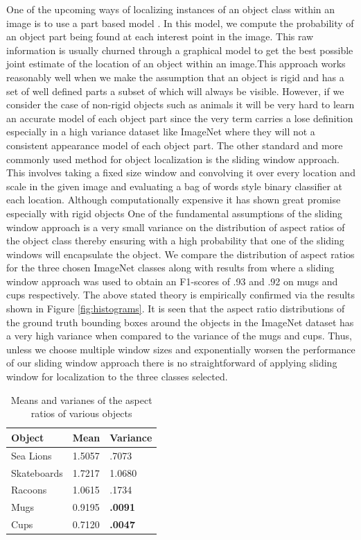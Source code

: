 \documentclass[10pt,twocolumn,letterpaper]{article}
\begin{document}
One of the upcoming ways of localizing instances of an object class within an image
is to use a part based model \cite{multiview1}. In this model, we compute the probability of an
object part being found at each interest point in the image. This raw information
is usually churned through a graphical model to get the best possible joint estimate
of the location of an object within an image.This approach works reasonably well
when we make the assumption that an object is rigid and has a set of well defined
parts a subset of which will always be visible. However, if we consider the case of 
non-rigid objects such as animals it will be very hard to learn an accurate model
of each object part since the very term carries a lose definition especially in a
high variance dataset like ImageNet where they will not a consistent appearance 
model of each object part.
The other standard and more commonly used method for object localization is the 
sliding window approach. This involves taking a fixed size window and convolving
it over every location and scale in the given image and evaluating a bag of words
style binary classifier at each location. Although computationally expensive
it has shown great promise especially with rigid objects \cite{multiview4}
One of the fundamental assumptions of the sliding window approach is a very small
variance on the distribution of aspect ratios of the object class thereby ensuring
with a high probability that one of the sliding windows will encapsulate the object.
We compare the distribution of aspect ratios for the three chosen ImageNet classes
along with results from \cite{aspect1} where a sliding window approach was used to
obtain an F1-scores of .93 and .92 on mugs and cups respectively. 
The above stated theory is empirically confirmed via the results shown in Figure \ref{fig:histograms}.
It is seen that the aspect ratio distributions of the ground truth bounding boxes around the
objects in the ImageNet dataset has a very high variance when compared to the variance of
the mugs and cups. Thus, unless we choose multiple window sizes and exponentially worsen
the performance of our sliding window approach there is no straightforward of applying
sliding window for localization to the three classes selected.

 \begin{table}
   \begin{center}
    \begin{tabular}{ | l | l | l | }
    \hline
    \textbf{Object} & \textbf{Mean} & \textbf{Variance}  \\ \hline
    Sea Lions & 1.5057 & .7073 \\ \hline
    Skateboards & 1.7217 & 1.0680 \\ \hline
    Racoons & 1.0615 & .1734 \\ \hline
    Mugs & 0.9195 & \textbf{.0091} \\ \hline
    Cups & 0.7120 & \textbf{.0047} \\ \hline
    \end{tabular}
    \caption{Means and varianes of the aspect ratios of various objects}
    \label{tab:aspect}
    \end{center}
  \end{table}
\end{document}
